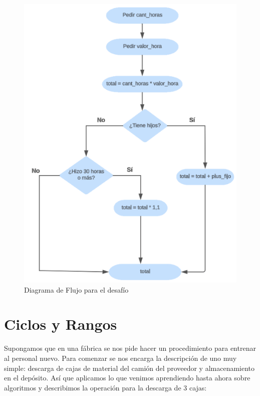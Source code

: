 \documentclass[
  letterpaper,
  DIV=11,
  numbers=noendperiod]{scrreprt}
\begin{document}
\begin{tcolorbox}
\begin{tcolorbox}
\begin{figure}[H]
{\centering \includegraphics{imgs/unidad_3/flujo-desafio.png}

}

\caption{Diagrama de Flujo para el desafío}

\end{figure}

\end{tcolorbox}

\end{tcolorbox}

\hypertarget{ciclos-y-rangos}{%
\section{Ciclos y Rangos}\label{ciclos-y-rangos}}

Supongamos que en una fábrica se nos pide hacer un procedimiento para
entrenar al personal nuevo. Para comenzar se nos encarga la descripción
de uno muy simple: descarga de cajas de material del camión del
proveedor y almacenamiento en el depósito. Así que aplicamos lo que
venimos aprendiendo hasta ahora sobre algoritmos y describimos la
operación para la descarga de 3 cajas:
\end{document}
